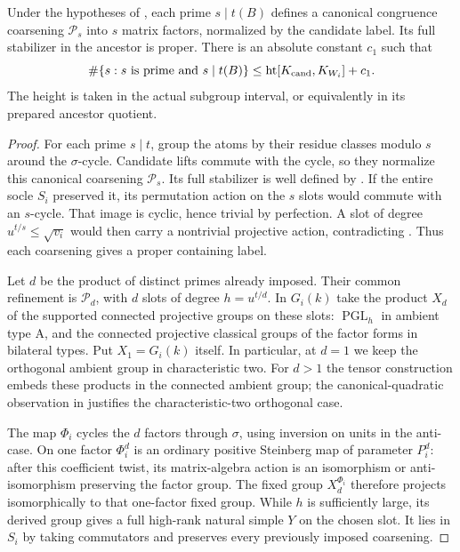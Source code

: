 \begin{proposition}\label{w:coarsening-count}
Under the hypotheses of , each prime $s\mid t(B)$ defines a canonical congruence coarsening $\mathcal P_s$ into $s$ matrix factors, normalized by the candidate label. Its full stabilizer in the ancestor is proper. There is an absolute constant $c_1$ such that
\[
 \#\{s:s\text{ is prime and }s\mid t(B)\}
 \le \operatorname{ht}[K_{\rm cand},K_{W_i}]+c_1.
\]
The height is taken in the actual subgroup interval, or equivalently in its prepared ancestor quotient.
\end{proposition}
\begin{proof}
For each prime $s\mid t$, group the atoms by their residue classes modulo
$s$ around the $\sigma$-cycle. Candidate lifts commute with the cycle,
so they normalize this canonical coarsening $\mathcal P_s$. Its full
stabilizer is well defined by . If the entire socle
$S_i$ preserved it, its permutation action on the $s$ slots would
commute with an $s$-cycle. That image is cyclic, hence trivial by
perfection. A slot of degree $u^{t/s}\le\sqrt{v_i}$ would then carry a
nontrivial projective action, contradicting .
Thus each coarsening gives a proper containing label.

Let $d$ be the product of distinct primes already imposed. Their common
refinement is $\mathcal P_d$, with $d$ slots of degree $h=u^{t/d}$.
In $G_i(k)$ take the product $X_d$ of the supported connected projective
groups on these slots: $\operatorname{PGL}_h$ in ambient type A, and
the connected projective classical groups of the factor forms in
bilateral types. Put $X_1=G_i(k)$ itself. In particular, at $d=1$ we
keep the orthogonal ambient group in characteristic two. For $d>1$
the tensor construction embeds these products in the connected ambient
group; the canonical-quadratic observation in 
justifies the characteristic-two orthogonal case.

The map $\Phi_i$ cycles the $d$ factors through $\sigma$, using inversion
on units in the anti-case. On one factor $\Phi_i^d$ is an ordinary
positive Steinberg map of parameter $P_i^d$: after this coefficient
twist, its matrix-algebra action is an isomorphism or anti-isomorphism
preserving the factor group. The fixed group $X_d^{\Phi_i}$ therefore
projects isomorphically to that one-factor fixed group. While $h$ is
sufficiently large, its derived group gives a full high-rank natural
simple $Y$ on the chosen slot. It lies in $S_i$ by taking commutators
and preserves every previously imposed coarsening.


\end{proof}
